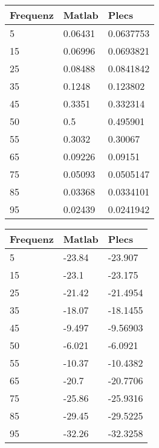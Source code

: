\begin{appendix}
\newpage
\begin{minipage}{0.49\textwidth}
	\centering
	\begin{tabular}{|l|l|l|}
		\hline
		Frequenz & Matlab  & Plecs     \\ \hline
		5        & 0.06431 & 0.0637753 \\ \hline
		15       & 0.06996 & 0.0693821 \\ \hline
		25       & 0.08488 & 0.0841842 \\ \hline
		35       & 0.1248  & 0.123802  \\ \hline
		45       & 0.3351  & 0.332314  \\ \hline
		50       & 0.5     & 0.495901  \\ \hline
		55       & 0.3032  & 0.30067   \\ \hline
		65       & 0.09226 & 0.09151   \\ \hline
		75       & 0.05093 & 0.0505147 \\ \hline
		85       & 0.03368 & 0.0334101 \\ \hline
		95       & 0.02439 & 0.0241942 \\ \hline
	\end{tabular}
	\label{tab:Schwing_50_Vergleich}
\end{minipage}
%
\begin{minipage}{0.49\textwidth}
	\begin{tabular}{|l|l|l|}
		\hline
		Frequenz & Matlab & Plecs    \\ \hline
		5        & -23.84 & -23.907  \\ \hline
		15       & -23.1  & -23.175  \\ \hline
		25       & -21.42 & -21.4954 \\ \hline
		35       & -18.07 & -18.1455 \\ \hline
		45       & -9.497 & -9.56903 \\ \hline
		50       & -6.021 & -6.0921  \\ \hline
		55       & -10.37 & -10.4382 \\ \hline
		65       & -20.7  & -20.7706 \\ \hline
		75       & -25.86 & -25.9316 \\ \hline
		85       & -29.45 & -29.5225 \\ \hline
		95       & -32.26 & -32.3258 \\ \hline
	\end{tabular}
	\label{tab:abs_Schwing_50_Vergleich} 	
\end{minipage}


\end{appendix}
